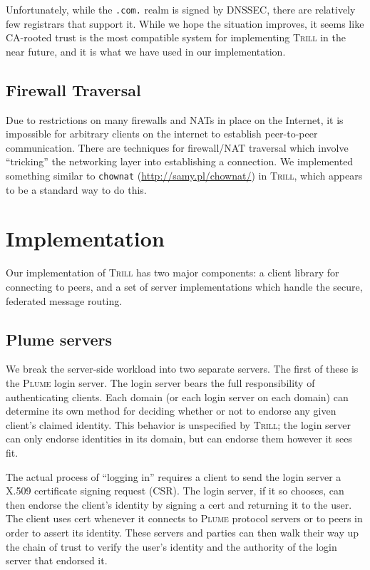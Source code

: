 \documentclass[11pt]{article}
\newcommand{\Trill}{\textsc{Trill}\xspace}
\newcommand{\Plume}{\textsc{Plume}\xspace}
\begin{document}
Unfortunately, while the \verb`.com.` realm is signed by DNSSEC, there are
relatively few registrars that support it. While we hope the situation improves,
it seems like CA-rooted trust is the most compatible system for implementing
\Trill in the near future, and it is what we have used in our implementation.

\subsection{Firewall Traversal}

Due to restrictions on many firewalls and NATs in place on the Internet, it is
impossible for arbitrary clients on the internet to establish peer-to-peer
communication. There are techniques for firewall/NAT traversal which involve
``tricking'' the networking layer into establishing a connection. We implemented
something similar to \texttt{chownat} (\url{http://samy.pl/chownat/}) in \Trill,
which appears to be a standard way to do this.

\section{Implementation}

Our implementation of \Trill has two major components: a client library for
connecting to peers, and a set of server implementations which handle the
secure, federated message routing.

\subsection{Plume servers}

We break the server-side workload into two separate servers.  The first of
these is the \Plume login server.  The login server bears the full
responsibility of authenticating clients.  Each domain (or each login server on
each domain) can determine its own method for deciding whether or not to
endorse any given client's claimed identity.  This behavior is unspecified by
\Trill; the login server can only endorse identities in its domain, but can
endorse them however it sees fit.

The actual process of ``logging in'' requires a client to send the login server
a X.509 certificate signing request (CSR).  The login server, if it so chooses,
can then endorse the client's identity by signing a cert and returning it to
the user.  The client uses cert whenever it connects to \Plume protocol servers
or to peers in order to assert its identity.  These servers and parties can
then walk their way up the chain of trust to verify the user's identity and the
authority of the login server that endorsed it.
\end{document}
